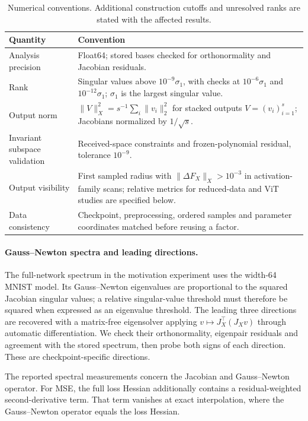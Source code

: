 \begin{table}[!htbp]\centering
\caption{Numerical conventions. Additional construction cutoffs and unresolved ranks are stated with the affected results.}\label{tab:early-method-numerical}
\small
\begin{tabular}{p{.28\linewidth}p{.65\linewidth}}\toprule
Quantity & Convention\\\midrule
Analysis precision & Float64; stored bases checked for orthonormality and Jacobian residuals.\\
Rank & Singular values above $10^{-9}\sigma_1$, with checks at $10^{-6}\sigma_1$ and $10^{-12}\sigma_1$; $\sigma_1$ is the largest singular value.\\
Output norm & $\|V\|_X^2=s^{-1}\sum_i\|v_i\|_2^2$ for stacked outputs $V=(v_i)_{i=1}^s$; Jacobians normalized by $1/\sqrt{s}$.\\
Invariant subspace validation & Received-space constraints and frozen-polynomial residual, tolerance $10^{-9}$.\\
Output visibility & First sampled radius with $\|\Delta F_X\|_X>10^{-3}$ in activation-family scans; relative metrics for reduced-data and ViT studies are specified below.\\
Data consistency & Checkpoint, preprocessing, ordered samples and parameter coordinates matched before reusing a factor.\\\bottomrule
\end{tabular}
\end{table}

\paragraph{Gauss--Newton spectra and leading directions.}
The full-network spectrum in the motivation experiment uses the width-64 MNIST model. Its Gauss--Newton eigenvalues are proportional to the squared Jacobian singular values; a relative singular-value threshold must therefore be squared when expressed as an eigenvalue threshold. The leading three directions are recovered with a matrix-free eigensolver applying $v\mapsto J_X^\top(J_Xv)$ through automatic differentiation. We check their orthonormality, eigenpair residuals and agreement with the stored spectrum, then probe both signs of each direction. These are checkpoint-specific directions.

The reported spectral measurements concern the Jacobian and Gauss--Newton operator. For MSE, the full loss Hessian additionally contains a residual-weighted second-derivative term. That term vanishes at exact interpolation, where the Gauss--Newton operator equals the loss Hessian.

